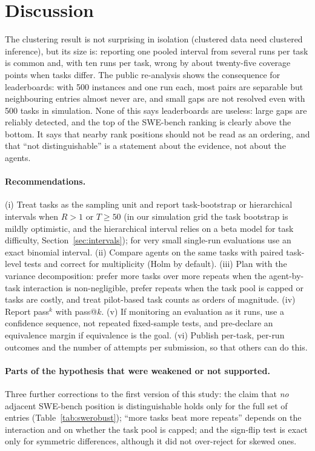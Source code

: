 \section{Discussion}
The clustering result is not surprising in isolation (clustered data need clustered inference), but its size is: reporting one pooled interval from several runs per task is common and, with ten runs per task, wrong by about twenty-five coverage points when tasks differ. The public re-analysis shows the consequence for leaderboards: with 500 instances and one run each, most pairs are separable but neighbouring entries almost never are, and small gaps are not resolved even with 500 tasks in simulation. None of this says leaderboards are useless: large gaps are reliably detected, and the top of the SWE-bench ranking is clearly above the bottom. It says that nearby rank positions should not be read as an ordering, and that ``not distinguishable'' is a statement about the evidence, not about the agents.

\paragraph{Recommendations.} (i) Treat tasks as the sampling unit and report task-bootstrap or hierarchical intervals when $R>1$ or $T\ge50$ (in our simulation grid the task bootstrap is mildly optimistic, and the hierarchical interval relies on a beta model for task difficulty, Section~\ref{sec:intervals}); for very small single-run evaluations use an exact binomial interval. (ii) Compare agents on the same tasks with paired task-level tests and correct for multiplicity (Holm by default). (iii) Plan with the variance decomposition: prefer more tasks over more repeats when the agent-by-task interaction is non-negligible, prefer repeats when the task pool is capped or tasks are costly, and treat pilot-based task counts as orders of magnitude. (iv) Report pass$^k$ with pass@$k$. (v) If monitoring an evaluation as it runs, use a confidence sequence, not repeated fixed-sample tests, and pre-declare an equivalence margin if equivalence is the goal. (vi) Publish per-task, per-run outcomes and the number of attempts per submission, so that others can do this.

\paragraph{Parts of the hypothesis that were weakened or not supported.} \REALREFUTED{} Three further corrections to the first version of this study: the claim that \emph{no} adjacent SWE-bench position is distinguishable holds only for the full set of entries (Table~\ref{tab:swerobust}); ``more tasks beat more repeats'' depends on the interaction and on whether the task pool is capped; and the sign-flip test is exact only for symmetric differences, although it did not over-reject for skewed ones.
